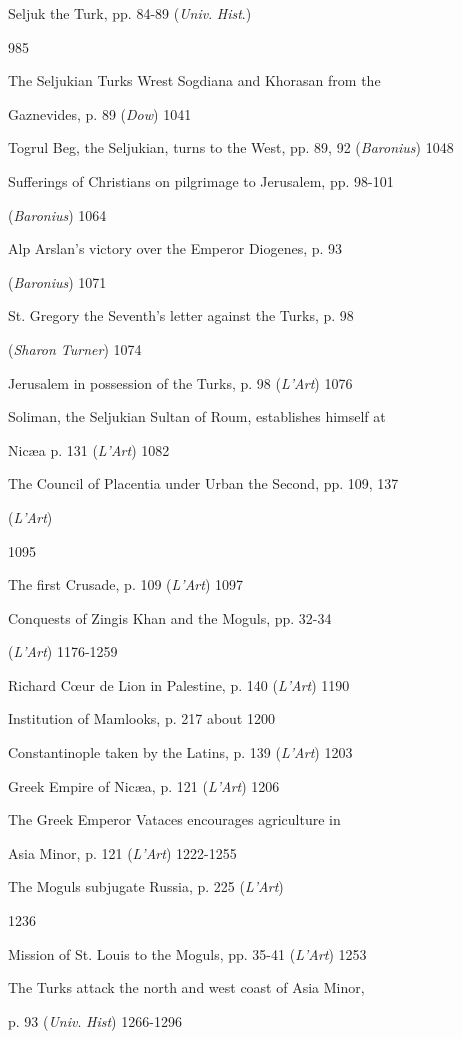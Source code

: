 Seljuk the Turk, pp. 84-89 (\emph{Univ}. \emph{Hist}.)

985

The Seljukian Turks Wrest Sogdiana and Khorasan
from the

Gaznevides, p. 89 (\emph{Dow})
1041

Togrul Beg, the Seljukian, turns to the West,
pp. 89, 92 (\emph{Baronius})
1048

Sufferings of Christians on pilgrimage to
Jerusalem, pp. 98-101

(\emph{Baronius})
1064

Alp Arslan's victory over the Emperor
Diogenes, p. 93

(\emph{Baronius})
1071

St. Gregory the Seventh's letter against the
Turks, p. 98

(\emph{Sharon Turner})
1074

Jerusalem in possession of the Turks, p. 98 (\emph{L'Art})
1076

Soliman, the Seljukian Sultan of Roum,
establishes himself at

Nicæa p. 131 (\emph{L'Art})
1082

The Council of Placentia under Urban the Second, pp. 109, 137

(\emph{L'Art})

1095

The first Crusade, p. 109 (\emph{L'Art})
1097

Conquests of Zingis Khan and the Moguls,
pp. 32-34

(\emph{L'Art})
1176-1259

Richard Cœur de Lion in Palestine, p. 140 (\emph{L'Art})
1190

Institution of Mamlooks, p. 217
about 1200

Constantinople taken by the Latins, p. 139 (\emph{L'Art})
1203

Greek Empire of Nicæa, p. 121 (\emph{L'Art})
1206

The Greek Emperor Vataces encourages
agriculture in

Asia Minor, p. 121 (\emph{L'Art})
1222-1255

The Moguls subjugate Russia, p. 225 (\emph{L'Art})

1236

Mission of St. Louis to the Moguls, pp. 35-41 (\emph{L'Art})
1253

The Turks attack the north and west coast of
Asia Minor,

p. 93 (\emph{Univ}. \emph{Hist})
1266-1296

